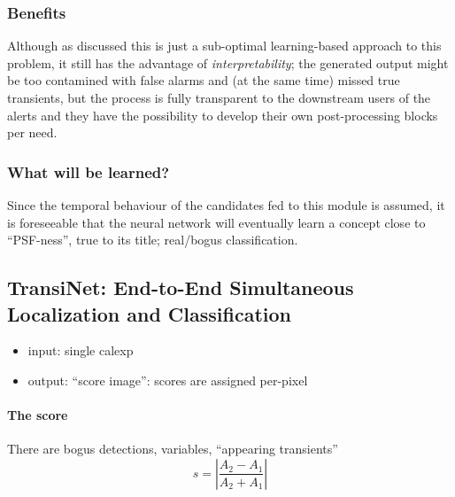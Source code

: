 \subsubsection{Benefits}
\label{sec:rb_benefits}

Although as discussed this is just a sub-optimal learning-based approach to this problem, it still has the advantage of \emph{interpretability}; the generated output might be too contamined with false alarms and (at the same time) missed true transients, but the process is fully transparent to the downstream users of the alerts and they have the possibility to develop their own post-processing blocks per need.


\subsubsection{What will be learned?}
Since the temporal behaviour of the candidates fed to this module is assumed, it is foreseeable that the neural network will eventually learn a concept close to ``PSF-ness'', true to its title; real/bogus classification.


\subsection{TransiNet: End-to-End Simultaneous Localization and Classification}

\begin{itemize}
  \item input: single calexp
  \item output: ``score image'': scores are assigned per-pixel
\end{itemize}


\paragraph{The score}
There are bogus detections, variables, ``appearing transients''
\begin{equation}
  s=\left| \frac{A_2-A_1}{A_2+A_1} \right|
\end{equation}


